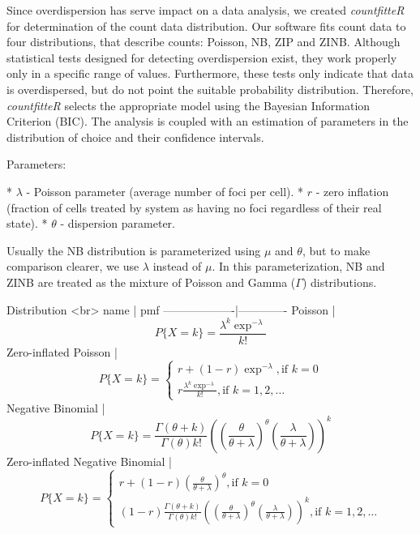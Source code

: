 Since overdispersion has serve impact on a data analysis, we created \emph{countfitteR} for determination of the count data distribution. Our software fits count data to four distributions, that describe counts: Poisson, NB, ZIP and ZINB. Although statistical tests designed for detecting overdispersion exist, they work properly only in a specific range of values. Furthermore, these tests only indicate that data is overdispersed, but do not point the suitable probability distribution. Therefore, \emph{countfitteR} selects the appropriate model using the Bayesian Information Criterion (BIC). The analysis is coupled with an estimation of parameters in the distribution of choice and their confidence intervals.  



Parameters:

* $\lambda$ - Poisson parameter (average number of foci per cell).  
* $r$ - zero inflation (fraction of cells treated by system as having no foci regardless of their real state).  
* $\theta$ - dispersion parameter.
  
Usually the NB distribution is parameterized using $\mu$ and $\theta$, but to make comparison clearer, we use $\lambda$ instead of $\mu$. In this parameterization, NB and ZINB are treated as the mixture of Poisson and Gamma ($\Gamma$) distributions.  

Distribution <br> name  | pmf 
-------------------|-------------
Poisson            |$$P\{X = k\} = \frac{\lambda^k \exp^{-\lambda}}{k!} $$
Zero-inflated Poisson                |$$P\{X = k\} = \begin{cases} r + ( 1- r) \exp^{-\lambda},\text{if } k = 0\\ r \frac{\lambda^k \exp^{-\lambda}}{k!},\text{if } k = 1, 2, \ldots \end{cases} $$
Negative Binomial                 |$$P\{X = k\} = \frac{\Gamma (\theta + k)}{\Gamma(\theta) k!}  \left(\left( \frac{\theta}{\theta + \lambda} \right)^\theta \left( \frac{\lambda}{\theta + \lambda} \right) \right)^k$$
Zero-inflated Negative Binomial               |$$P\{X = k\} = \begin{cases}r + (1 - r) \left( \frac{\theta}{\theta + \lambda} \right)^\theta,\text{if } k = 0\\(1 - r) \frac{\Gamma (\theta + k)}{\Gamma(\theta) k!}  \left(\left( \frac{\theta}{\theta + \lambda} \right)^\theta \left( \frac{\lambda}{\theta + \lambda} \right) \right)^k,\text{if } k = 1, 2, \ldots\end{cases}$$

